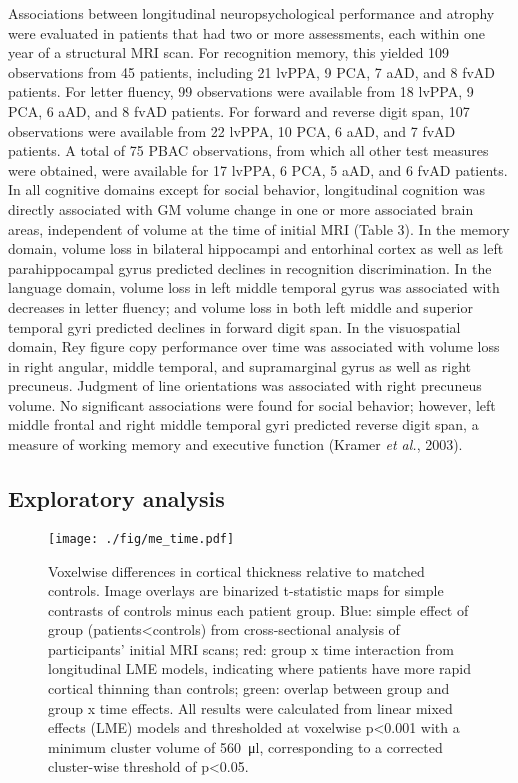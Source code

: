 \documentclass[]{article}
\begin{document}
Associations between longitudinal neuropsychological performance and
atrophy were evaluated in patients that had two or more assessments,
each within one year of a structural MRI scan. For recognition memory,
this yielded 109 observations from 45 patients, including 21 lvPPA, 9
PCA, 7 aAD, and 8 fvAD patients. For letter fluency, 99 observations
were available from 18 lvPPA, 9 PCA, 6 aAD, and 8 fvAD patients. For
forward and reverse digit span, 107 observations were available from 22
lvPPA, 10 PCA, 6 aAD, and 7 fvAD patients. A total of 75 PBAC
observations, from which all other test measures were obtained, were
available for 17 lvPPA, 6 PCA, 5 aAD, and 6 fvAD patients. In all
cognitive domains except for social behavior, longitudinal cognition was
directly associated with GM volume change in one or more associated
brain areas, independent of volume at the time of initial MRI (Table 3).
In the memory domain, volume loss in bilateral hippocampi and entorhinal
cortex as well as left parahippocampal gyrus predicted declines in
recognition discrimination. In the language domain, volume loss in left
middle temporal gyrus was associated with decreases in letter fluency;
and volume loss in both left middle and superior temporal gyri predicted
declines in forward digit span. In the visuospatial domain, Rey figure
copy performance over time was associated with volume loss in right
angular, middle temporal, and supramarginal gyrus as well as right
precuneus. Judgment of line orientations was associated with right
precuneus volume. No significant associations were found for social
behavior; however, left middle frontal and right middle temporal gyri
predicted reverse digit span, a measure of working memory and executive
function (Kramer \emph{et al.}, 2003).

\subsection*{Exploratory analysis}\label{exploratory-analysis}

\begin{figure}[]

{\centering \texttt{[image: ./fig/me\_time.pdf]} 

}

\caption[GM time effects]{Voxelwise differences in cortical thickness relative to matched controls. Image overlays are binarized t-statistic maps for simple contrasts of controls minus each patient group. Blue: simple effect of group (patients<controls) from cross-sectional analysis of participants' initial MRI scans; red: group x time interaction from longitudinal LME models, indicating where patients have more rapid cortical thinning than controls; green: overlap between group and group x time effects. All results were calculated from linear mixed effects (LME) models and thresholded at voxelwise p<0.001 with a minimum cluster volume of \SI{560}{\micro\litre}, corresponding to a corrected cluster-wise threshold of p<0.05. \label{gm_me_time}}

\end{figure}
\end{document}
